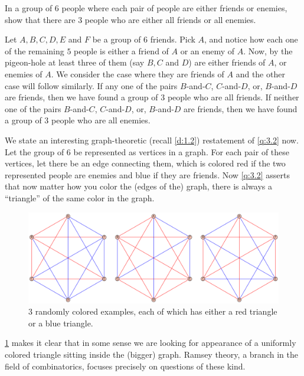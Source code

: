 \begin{question}
In a group of $6$ people where each pair of people are either friends or enemies, show that there are $3$ people who are either all friends or all enemies. 
\label{q:3.2}
\end{question}
\begin{solution}
Let $A,B,C,D,E$ and $F$ be a group of $6$ friends. Pick $A$, and notice how each one of the remaining $5$ people is either a friend of $A$ or an enemy of $A$. Now, by the pigeon-hole at least three of them (say $B,C$ and $D$) are either friends of $A$, or enemies of $A$. We consider the case where they are friends of $A$ and the other case will follow similarly. If any one of the pairs $B$-and-$C$, $C$-and-$D$, or, $B$-and-$D$ are friends, then we have found a group of $3$ people who are all friends. If neither one of the pairs $B$-and-$C$, $C$-and-$D$, or, $B$-and-$D$ are friends, then we have found a group of $3$ people who are all enemies.
\end{solution}
We state an interesting graph-theoretic (recall \cref{d:1.2}) restatement of \cref{q:3.2} now. Let the group of $6$ be represented as vertices in a graph. For each pair of these vertices, let there be an edge connecting them, which is colored red if the two represented people are enemies and blue if they are friends. Now \cref{q:3.2} asserts that now matter how you color the (edges of the) graph, there is always a ``triangle'' of the same color in the graph. 
\begin{figure}[H]
    \centering
    \includegraphics[width=0.9\linewidth]{Images/Figure10.png}
    \caption{3 randomly colored examples, each of which has either a red triangle or a blue triangle.}
    \label{f:10}
\end{figure}
\begin{remark}
\cref{f:10} makes it clear that in some sense we are looking for appearance of a uniformly colored triangle sitting inside the (bigger) graph. Ramsey theory, a branch in the field of combinatorics, focuses precisely on questions of these kind.
\end{remark}

